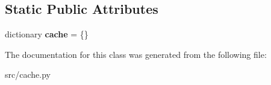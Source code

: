 \subsection*{\-Static \-Public \-Attributes}
\begin{DoxyCompactItemize}
\item 
\hypertarget{classsrc_1_1cache_1_1_image_cache_abf4f360706061a9524b39be34cdf711e}{dictionary {\bfseries cache} = \{\}}\label{classsrc_1_1cache_1_1_image_cache_abf4f360706061a9524b39be34cdf711e}

\end{DoxyCompactItemize}


\-The documentation for this class was generated from the following file\-:\begin{DoxyCompactItemize}
\item 
src/cache.\-py\end{DoxyCompactItemize}
